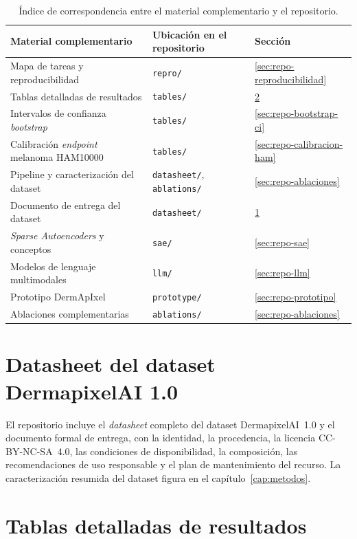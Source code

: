 \begin{table}[H]
\centering
\footnotesize
\setlength{\tabcolsep}{5pt}
\renewcommand{\arraystretch}{1.1}
\caption{Índice de correspondencia entre el material complementario y el repositorio.}
\label{tab:repo-indice}
\begin{tabular}{lll}
\hline
Material complementario & Ubicación en el repositorio & Sección \\
\hline
Mapa de tareas y reproducibilidad & \texttt{repro/} & \ref{sec:repo-reproducibilidad} \\
Tablas detalladas de resultados & \texttt{tables/} & \ref{sec:repo-tablas} \\
Intervalos de confianza \emph{bootstrap} & \texttt{tables/} & \ref{sec:repo-bootstrap-ci} \\
Calibración \emph{endpoint} melanoma HAM10000 & \texttt{tables/} & \ref{sec:repo-calibracion-ham} \\
Pipeline y caracterización del dataset & \texttt{datasheet/}, \texttt{ablations/} & \ref{sec:repo-ablaciones} \\
Documento de entrega del dataset & \texttt{datasheet/} & \ref{sec:repo-datasheet} \\
\emph{Sparse Autoencoders} y conceptos & \texttt{sae/} & \ref{sec:repo-sae} \\
Modelos de lenguaje multimodales & \texttt{llm/} & \ref{sec:repo-llm} \\
Prototipo DermApIxel & \texttt{prototype/} & \ref{sec:repo-prototipo} \\
Ablaciones complementarias & \texttt{ablations/} & \ref{sec:repo-ablaciones} \\
\hline
\end{tabular}
\end{table}

\section{Datasheet del dataset DermapixelAI 1.0}
\label{sec:repo-datasheet}

El repositorio incluye el \emph{datasheet} completo del dataset
DermapixelAI~1.0 y el documento formal de entrega, con la
identidad, la procedencia, la licencia CC-BY-NC-SA~4.0, las
condiciones de disponibilidad, la composición, las
recomendaciones de uso responsable y el plan de mantenimiento del
recurso. La caracterización resumida del dataset figura en el
capítulo~\ref{cap:metodos}.

\section{Tablas detalladas de resultados}
\label{sec:repo-tablas}

